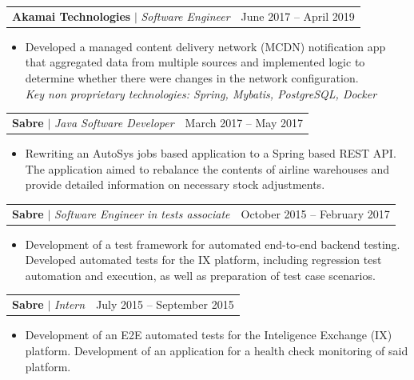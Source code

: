 \documentclass[letterpaper,11pt]{article}
\makeatletter
\newcommand{\resumeProjectHeading}[2]{
    \item
    \begin{tabular*}{0.97\textwidth}{l@{\extracolsep{\fill}}r}
      \small#1 & #2 \\
    \end{tabular*}\vspace{-7pt}
}
\makeatother
\begin{document}
          \resumeProjectHeading
          {\textbf{Akamai Technologies} $|$ \footnotesize\emph{Software Engineer}\vspace{8pt}}{June 2017 -- April 2019}
          {\small{
            \begin{itemize}
                \item \justifying Developed a managed content delivery network (MCDN) notification app that aggregated data from multiple sources and implemented logic to determine whether there were changes in the network configuration. \\
                \textit{Key non proprietary technologies: Spring, Mybatis, PostgreSQL, Docker }
            \end{itemize}
            }

          \resumeProjectHeading
          {\textbf{Sabre} $|$ \footnotesize\emph{Java Software Developer}\vspace{8pt}}{March 2017 -- May 2017}
          {\small{
          \begin{itemize}
              \item \justifying Rewriting an AutoSys jobs based application to a Spring based REST API. The application aimed to rebalance the contents of airline warehouses and provide detailed information on necessary stock adjustments.
          \end{itemize} 
}}

          \resumeProjectHeading
          {\textbf{Sabre} $|$ \footnotesize\emph{Software Engineer in tests associate}\vspace{8pt}}{October 2015 -- February 2017}
          {\small{
          \begin{itemize}
              \item \justifying Development of a test framework for automated end-to-end backend testing. Developed automated tests for the IX platform, including regression test automation and execution, as well as preparation of test case scenarios.
          \end{itemize}

}}

          \resumeProjectHeading
          {\textbf{Sabre} $|$ \footnotesize\emph{Intern}\vspace{8pt}}{July 2015 -- September 2015}
          {\small{
          \begin{itemize}
              \item \justifying Development of an E2E automated tests for the
Inteligence Exchange (IX) platform. Development of an application for a health check monitoring of said platform.
          \end{itemize}
}}

}
\end{document}
